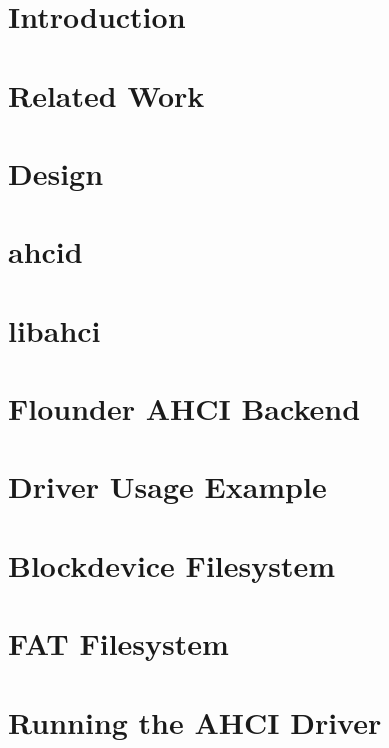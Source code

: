 \documentclass[11pt,a4paper,twoside,openright,cleardoublepage=plain]{scrreprt}
\begin{document}


\maketitle



\tableofcontents

\chapter{Introduction}


\chapter{Related Work}


\chapter{Design}


\chapter{ahcid}


\chapter{libahci}


\chapter{Flounder AHCI Backend}


\chapter{Driver Usage Example}


\chapter{Blockdevice Filesystem}


\chapter{FAT Filesystem}


\chapter{Running the AHCI Driver}

\end{document}
